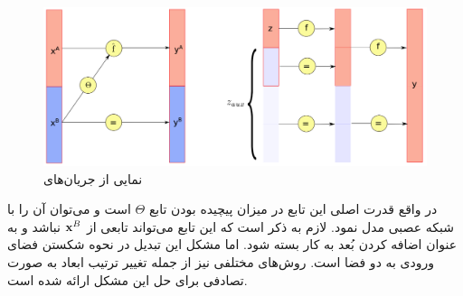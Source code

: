 \begin{figure}[H]
	\centering
	\includegraphics[width=.7\textwidth]{images/flow-survey1.png}
	\caption{
        نمایی از جریان‌های \coupling{}
\cite{flow_survey}	}
\label{fig:chap2:flow_coupling}
\end{figure}

در واقع قدرت اصلی این تابع در میزان پیچیده بودن تابع $\Theta$ است و می‌توان آن را با شبکه عصبی مدل نمود. لازم به ذکر است که این تابع می‌تواند تابعی از ${\bf x}^B$ نباشد و به عنوان اضافه کردن بُعد به کار بسته شود. اما مشکل این تبدیل در نحوه شکستن فضای ورودی به دو فضا است. روش‌های مختلفی نیز از جمله تغییر ترتیب ابعاد به صورت تصادفی برای حل این مشکل ارائه شده است.
